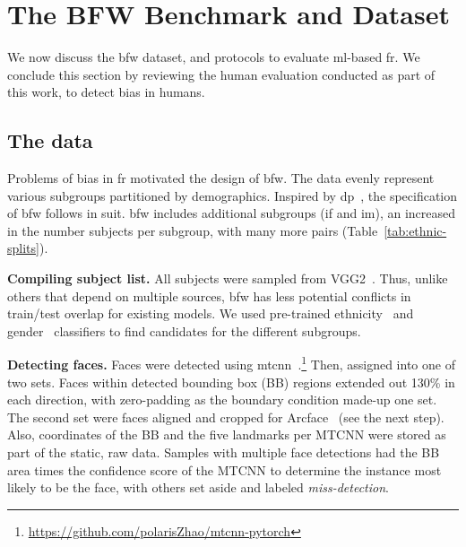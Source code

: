 \section{The BFW Benchmark and Dataset}


We now discuss the \gls{bfw} dataset, and protocols to evaluate \gls{ml}-based \gls{fr}. We  conclude this section by reviewing the human evaluation conducted as part of this work, to detect bias in humans.

\subsection{The data}
Problems of bias in \gls{fr} motivated the design of \gls{bfw}. The data evenly represent various subgroups partitioned by demographics. Inspired by \gls{dp}~\cite{demogPairs}, the specification of \gls{bfw} follows in suit. \gls{bfw} includes additional subgroups (\ie \gls{if} and \gls{im}), an increased in the number subjects per subgroup, with many more pairs (Table~\ref{tab:ethnic-splits}). 




\vspace{1mm}
\noindent\textbf{Compiling subject list.} 
 All subjects were sampled from VGG2~\cite{Cao18}. Thus, unlike others that depend on multiple sources, \gls{bfw} has less potential conflicts in train/test overlap for existing models. We used pre-trained ethnicity~\cite{ambekar2009name} and gender~\cite{levi2015age} classifiers to find candidates for the different subgroups.



\vspace{1mm}
\noindent\textbf{Detecting faces.} Faces were detected using \gls{mtcnn}~\cite{zhang2016joint}.\footnote{\href{https://github.com/polarisZhao/mtcnn-pytorch}{https://github.com/polarisZhao/mtcnn-pytorch}} Then, assigned into one of two sets. Faces within detected bounding box (BB) regions extended out 130\% in each direction, with zero-padding as the boundary condition made-up one set. The second set were faces aligned and cropped for Arcface~\cite{deng2019arcface} (see the next step). Also, coordinates of the BB and the five landmarks per MTCNN were stored as part of the static, raw data. Samples with multiple face detections had the BB area times the confidence score of the MTCNN to determine the instance most likely to be the face, with others set aside and labeled \textit{miss-detection}. 

